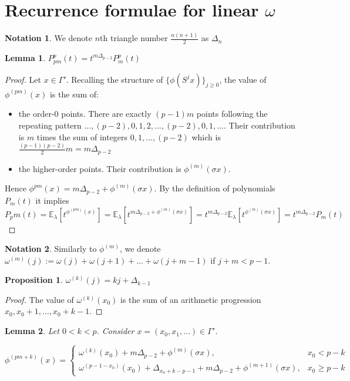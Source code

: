 \documentclass[a4paper]{article}
\theoremstyle{plain}
\newtheorem{lemma}{Lemma}[section]
\newtheorem{proposition}{Proposition}[section]
\theoremstyle{definition}
\newtheorem*{notation}{Notation}
\begin{document}
\section{Recurrence formulae for linear $\omega$}
\begin{notation} We denote $n$th triangle number $\frac{n(n+1)}{2}$ as $\Delta_n$ \end{notation}
\begin{lemma}\label{simpleCase} $P_{pm}^p(t)=t^{m\Delta_{p-2}}P_m^p(t)$
\end{lemma}
\begin{proof}
Let $x \in \Gamma'$. Recalling the structure of $\{\phi(S^j x)\}_{j \ge 0}$, the value of $\phi^{(pm)}(x)$ is the sum of:
\begin{itemize}
\item the order-$0$ points. There are exactly $(p-1)m$ points following the repeating pattern $\ldots,(p-2),0,1,2,...,(p-2),0,1,\ldots$. Their contribution is $m$ times the sum of integers $0,1,\ldots,(p-2)$ which is $\frac{(p-1)(p-2)}{2}m=m\Delta_{p-2}$
\item the higher-order points. Their contribution is $\phi^{(m)}(\sigma x)$.
\end{itemize}
Hence $\phi^{pm}(x) = m\Delta_{p-2} + \phi^{(m)}(\sigma x)$. By the definition of polynomials $P_m(t)$ it implies 
$P_pm(t) = \mathbb{E}_\lambda\left[ t^{\phi^{(pm)}(x)}\right] = 
\mathbb{E}_\lambda\left[ t^{m\Delta_{p-2} + \phi^{(m)}(\sigma x)}\right] = 
t^{m\Delta_{p-2}} \mathbb{E}_\lambda \left[ t^{\phi^{(m)} (\sigma x)}  \right] = 
t^{m\Delta_{p-2} }P_m(t)$
\end{proof}
\begin{notation}
Similarly to $\phi^{(m)}$, we denote $\omega^{(m)}(j) := \omega(j) + \omega(j+1) + \ldots + \omega(j+m-1)$ if $j + m < p - 1$.
\end{notation}
\begin{proposition} $\omega^{(k)}(j) = k j + \Delta_{k-1}$
\end{proposition}
\begin{proof}
The value of $\omega^{(k)}(x_0)$ is the sum of an arithmetic progression $x_0, x_0 + 1, \ldots, x_0 + k-1$.
\end{proof}
\begin{lemma} \label{phiLemma}
Let $0 < k < p$. Consider $x=(x_0,x_1,\ldots) \in \Gamma'$.

$\phi^{(pm+k)}(x)= 
\begin{cases}
\omega^{(k)}(x_0) + m\Delta_{p-2} + \phi^{(m)}(\sigma x), & x_0 < p-k\\
\omega^{(p-1-x_0)}(x_0) + \Delta_{x_0+k-p-1}+m\Delta_{p-2}+\phi^{(m+1)}(\sigma x), & x_0 \ge p-k
\end{cases}$
\end{lemma}
\end{document}
